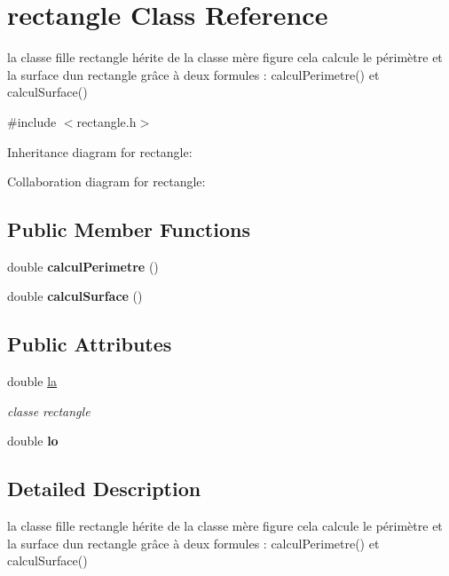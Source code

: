 \hypertarget{classrectangle}{}\section{rectangle Class Reference}
\label{classrectangle}


la classe fille rectangle hérite de la classe mère figure cela calcule le périmètre et la surface d\textquotesingle{}un rectangle grâce à deux formules \+: calcul\+Perimetre() et calcul\+Surface()  




{\ttfamily \#include $<$rectangle.\+h$>$}



Inheritance diagram for rectangle\+:


Collaboration diagram for rectangle\+:
\subsection*{Public Member Functions}
\begin{DoxyCompactItemize}
\item 
\mbox{\label{classrectangle_ac8314b42f40c782bf3a9174ab7c41ae1}} 
double {\bfseries calcul\+Perimetre} ()
\item 
\mbox{\label{classrectangle_a162f14b8009f58f79ecfedcaed40a594}} 
double {\bfseries calcul\+Surface} ()
\end{DoxyCompactItemize}
\subsection*{Public Attributes}
\begin{DoxyCompactItemize}
\item 
double \hyperlink{classrectangle_a1aa627f392f0467633d9dcd2128b8742}{la}
\begin{DoxyCompactList}\small\item\em classe rectangle \end{DoxyCompactList}\item 
\mbox{\label{classrectangle_ad63633ec4f090ee699b66b233c74301a}} 
double {\bfseries lo}
\end{DoxyCompactItemize}


\subsection{Detailed Description}
la classe fille rectangle hérite de la classe mère figure cela calcule le périmètre et la surface d\textquotesingle{}un rectangle grâce à deux formules \+: calcul\+Perimetre() et calcul\+Surface() 

